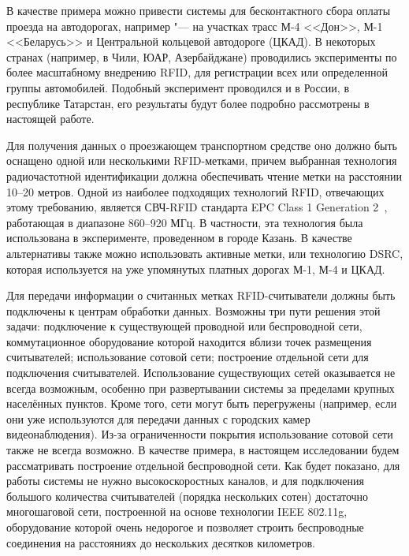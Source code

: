 В качестве примера можно привести системы для бесконтактного сбора оплаты проезда на автодорогах, например "--- на участках трасс М-4 <<Дон>>, М-1 <<Беларусь>> и Центральной кольцевой автодороге (ЦКАД). В некоторых странах (например, в Чили, ЮАР, Азербайджане) проводились эксперименты по более масштабному внедрению RFID, для регистрации всех или определенной группы автомобилей. Подобный эксперимент проводился и в России, в республике Татарстан, его результаты будут более подробно рассмотрены в настоящей работе.

Для получения данных о проезжающем транспортном средстве оно должно быть оснащено одной или несколькими RFID-метками, причем выбранная технология радиочастотной идентификации должна обеспечивать чтение метки на расстоянии 10--20 метров. Одной из наиболее подходящих технологий RFID, отвечающих этому требованию, является СВЧ-RFID стандарта EPC Class 1 Generation 2~\cite{StdGen2}, работающая в диапазоне 860--920 МГц. В частности, эта технология была использована в эксперименте, проведенном в городе Казань. В качестве альтернативы также можно использовать активные метки, или технологию DSRC, которая используется на уже упомянутых платных дорогах М-1, М-4 и ЦКАД.


Для передачи информации о считанных метках RFID-считыватели должны быть подключены к центрам обработки данных. Возможны три пути решения этой задачи: подключение к существующей проводной или беспроводной сети, коммутационное оборудование которой находится вблизи точек размещения считывателей; использование сотовой сети; построение отдельной сети для подключения считывателей. Использование существующих сетей оказывается не всегда возможным, особенно при развертывании системы за пределами крупных населённых пунктов. Кроме того, сети могут быть перегружены (например, если они уже используются для передачи данных с городских камер видеонаблюдения). Из-за ограниченности покрытия использование сотовой сети также не всегда возможно. В качестве примера, в настоящем исследовании будем рассматривать построение отдельной беспроводной сети. Как будет показано, для работы системы не нужно высокоскоростных каналов, и для подключения большого количества считывателей (порядка нескольких сотен) достаточно многошаговой сети, построенной на основе технологии IEEE 802.11g, оборудование которой очень недорогое и позволяет строить беспроводные соединения на расстояниях до нескольких десятков километров.

